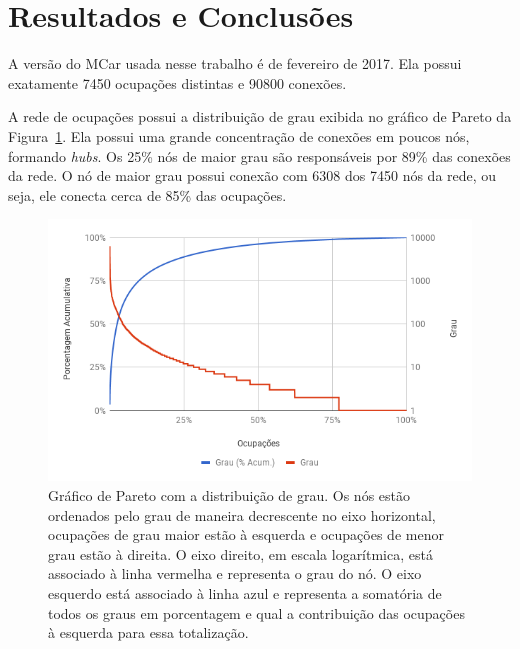 \documentclass[
  article,
  11pt,
  a4paper,
  english,
  brazil,
  sumario=tradicional]{abntex2}
\begin{document}

\section{Resultados e Conclusões} \label{sec:resultados}



A versão do MCar usada nesse trabalho é de fevereiro de 2017. Ela possui exatamente 7450 ocupações distintas e 90800 conexões.

A rede de ocupações possui a distribuição de grau exibida no gráfico de Pareto da Figura~\ref{fig:pareto-ocupacoes}. Ela possui uma grande concentração de conexões em poucos nós, formando \textit{hubs}. Os 25\% nós de maior grau são responsáveis por 89\% das conexões da rede. O nó de maior grau possui conexão com 6308 dos 7450 nós da rede, ou seja, ele conecta cerca de 85\% das ocupações.

\begin{figure}[htb]
  \centering
  \includegraphics[width=0.9\linewidth]{pareto-ocupacoes.png}
  \caption{Gráfico de Pareto com a distribuição de grau. Os nós estão ordenados pelo grau de maneira decrescente no eixo horizontal, ocupações de grau maior estão à esquerda e ocupações de menor grau estão à direita. O eixo direito, em escala logarítmica, está associado à linha vermelha e representa o grau do nó. O eixo esquerdo está associado à linha azul e representa a somatória de todos os graus em porcentagem e qual a contribuição das ocupações à esquerda para essa totalização.}
  \label{fig:pareto-ocupacoes}
\end{figure}
\end{document}
